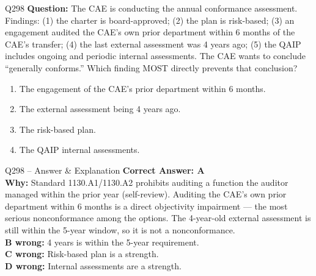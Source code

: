 \documentclass[aspectratio=169,10pt]{beamer}
\begin{document}
	\begin{frame}[t]{Q298}
		\small
		\textbf{Question:} The CAE is conducting the annual conformance assessment. Findings: (1) the charter is board-approved; (2) the plan is risk-based; (3) an engagement audited the CAE's own prior department within 6 months of the CAE's transfer; (4) the last external assessment was 4 years ago; (5) the QAIP includes ongoing and periodic internal assessments. The CAE wants to conclude ``generally conforms.'' Which finding MOST directly prevents that conclusion?
		\begin{enumerate}[label=\Alph*.,itemsep=1pt,topsep=2pt]
			\item The engagement of the CAE's prior department within 6 months.
			\item The external assessment being 4 years ago.
			\item The risk-based plan.
			\item The QAIP internal assessments.
		\end{enumerate}
	\end{frame}
	
	\begin{frame}[t]{Q298 -- Answer \& Explanation}
		\small
		\textbf{Correct Answer: A} \\[4pt]
		\textbf{Why:} Standard 1130.A1/1130.A2 prohibits auditing a function the auditor managed within the prior year (self-review). Auditing the CAE's own prior department within 6 months is a direct objectivity impairment — the most serious nonconformance among the options. The 4-year-old external assessment is still within the 5-year window, so it is not a nonconformance. \\[4pt]
		\textbf{B wrong:} 4 years is within the 5-year requirement. \\[2pt]
		\textbf{C wrong:} Risk-based plan is a strength. \\[2pt]
		\textbf{D wrong:} Internal assessments are a strength.
	\end{frame}
	
\end{document}
